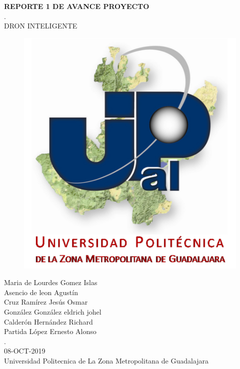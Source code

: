 \documentclass[11pt,a4paper]{article}
\begin{document}
\begin{center}
\textbf{REPORTE 1 DE AVANCE PROYECTO}\\
.\\
DRON INTELIGENTE
\end{center}

\begin{figure}[h]
\centering
\includegraphics[width=12.5cm]{upzmg.png} 
\end{figure}

\begin{center}
Maria de Lourdes Gomez Islas\\
Asencio de leon Agustín\\
Cruz Ramírez Jesús Osmar\\
González González eldrich johel\\
Calderón Hernández Richard\\
Partida López Ernesto Alonso\\
.\\
08-OCT-2019\\
Universidad Politecnica de La Zona Metropolitana de Guadalajara
\end{center}

\newpage 
\end{document}
